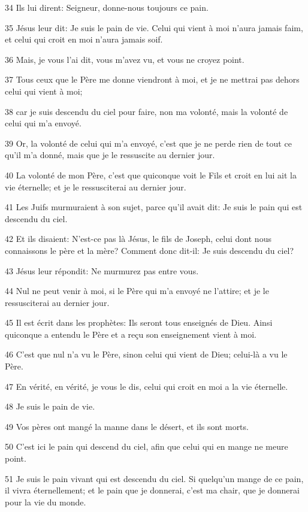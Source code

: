 \par 34 Ils lui dirent: Seigneur, donne-nous toujours ce pain.
\par 35 Jésus leur dit: Je suis le pain de vie. Celui qui vient à moi n'aura jamais faim, et celui qui croit en moi n'aura jamais soif.
\par 36 Mais, je vous l'ai dit, vous m'avez vu, et vous ne croyez point.
\par 37 Tous ceux que le Père me donne viendront à moi, et je ne mettrai pas dehors celui qui vient à moi;
\par 38 car je suis descendu du ciel pour faire, non ma volonté, mais la volonté de celui qui m'a envoyé.
\par 39 Or, la volonté de celui qui m'a envoyé, c'est que je ne perde rien de tout ce qu'il m'a donné, mais que je le ressuscite au dernier jour.
\par 40 La volonté de mon Père, c'est que quiconque voit le Fils et croit en lui ait la vie éternelle; et je le ressusciterai au dernier jour.
\par 41 Les Juifs murmuraient à son sujet, parce qu'il avait dit: Je suis le pain qui est descendu du ciel.
\par 42 Et ils disaient: N'est-ce pas là Jésus, le fils de Joseph, celui dont nous connaissons le père et la mère? Comment donc dit-il: Je suis descendu du ciel?
\par 43 Jésus leur répondit: Ne murmurez pas entre vous.
\par 44 Nul ne peut venir à moi, si le Père qui m'a envoyé ne l'attire; et je le ressusciterai au dernier jour.
\par 45 Il est écrit dans les prophètes: Ils seront tous enseignés de Dieu. Ainsi quiconque a entendu le Père et a reçu son enseignement vient à moi.
\par 46 C'est que nul n'a vu le Père, sinon celui qui vient de Dieu; celui-là a vu le Père.
\par 47 En vérité, en vérité, je vous le dis, celui qui croit en moi a la vie éternelle.
\par 48 Je suis le pain de vie.
\par 49 Vos pères ont mangé la manne dans le désert, et ils sont morts.
\par 50 C'est ici le pain qui descend du ciel, afin que celui qui en mange ne meure point.
\par 51 Je suis le pain vivant qui est descendu du ciel. Si quelqu'un mange de ce pain, il vivra éternellement; et le pain que je donnerai, c'est ma chair, que je donnerai pour la vie du monde.

